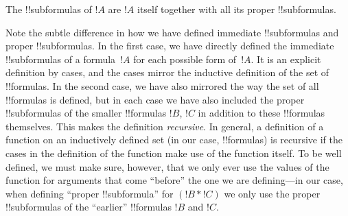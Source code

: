 \documentclass[../../include/open-logic-section]{subfiles}
\begin{document}
\begin{defn}[!!^{subformula}]
The !!{subformula}s of $!A$ are $!A$ itself together with all its
proper !!{subformula}s.
\end{defn}

\begin{explain}
Note the subtle difference in how we have defined immediate
!!{subformula}s and proper !!{subformula}s.  In the first case, we
have directly defined the immediate !!{subformula}s of a formula~$!A$
for each possible form of~$!A$.  It is an explicit definition by
cases, and the cases mirror the inductive definition of the set of
!!{formula}s.  In the second case, we have also mirrored the way the
set of all !!{formula}s is defined, but in each case we have also
included the proper !!{subformula}s of the smaller !!{formula}s $!B$,
$!C$ in addition to these !!{formula}s themselves.  This makes the
definition \emph{recursive}.  In general, a definition of a function
on an inductively defined set (in our case, !!{formula}s) is recursive
if the cases in the definition of the function make use of
the function itself. To be well defined, we must make sure, however,
that we only ever use the values of the function for arguments that
come ``before'' the one we are defining---in our case, when defining
``proper !!{subformula}'' for $(!B \ast !C)$ we only use the proper
!!{subformula}s of the ``earlier'' !!{formula}s $!B$ and $!C$.
\end{explain}
\end{document}
